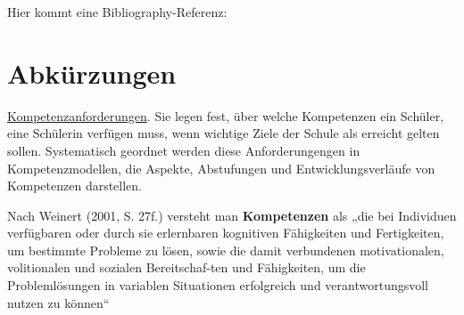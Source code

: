 \documentclass[
12pt,
english,
ngerman,
headsepline,
twoside,
openright,
numbers=noenddot,version=first
]{scrreprt}
\begin{document}
Hier kommt eine Bibliography-Referenz: \cite{booch2007object}

\lstlistoflistings

\listoffigures

\listoftables

\chapter*{Abkürzungen}









\underline{Kompetenzanforderungen}. Sie legen fest, über welche Kompetenzen ein Schüler, eine Schülerin verfügen muss, wenn wichtige Ziele der Schule als erreicht gelten sollen. Systematisch geordnet werden diese Anforderungengen in Kompetenzmodellen, die Aspekte, Abstufungen und Entwicklungsverläufe von Kompetenzen darstellen.

Nach Weinert (2001, S. 27f.) versteht man \textbf{Kompetenzen} als „die bei Individuen verfügbaren oder durch sie erlernbaren kognitiven Fähigkeiten und Fertigkeiten, um bestimmte Probleme zu lösen, sowie die damit verbundenen motivationalen, volitionalen und sozialen Bereitschaf-ten und Fähigkeiten, um die Problemlösungen in variablen Situationen erfolgreich und verantwortungsvoll nutzen zu können“
\end{document}
